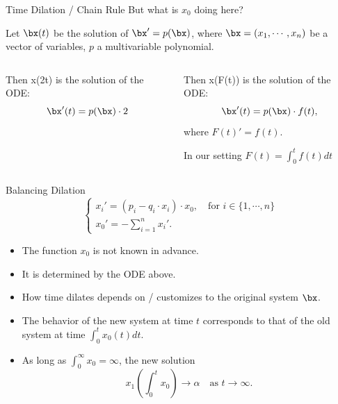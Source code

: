\documentclass[aspectratio=169]{beamer}
\begin{document}
\begin{frame}[Clean]{Time Dilation / Chain Rule}
But what is $x_0$ doing here?

Let $\bx(t)$ be the solution of $\bx' = p(\bx)$, where $\bx=(x_1, \cdots, x_n)$ be a vector of variables, $p$ a multivariable polynomial.
\begin{columns}
\begin{column}{0.5\textwidth}
   \begin{example}
 Then x(2t) is the solution of the ODE:
    \[
        \bx'(t) = p(\bx) \cdot 2
    \]
\end{example}
\end{column}
\begin{column}{0.5\textwidth}  %
\begin{example}
  Then x(F(t)) is the solution of the ODE:
  \[
        \bx'(t) = p(\bx) \cdot f(t),
  \]
  where $F(t)' = f(t)$.

  In our setting $F(t) =\int_{0}^{t} f(t) dt$
\end{example}
\end{column}
\end{columns}
\end{frame}

\begin{frame}[Clean]{Balancing Dilation}
\[
\begin{cases}
  x_i' = (p_i - q_i \cdot x_i)\cdot x_0,  \quad \text{for $i\in\{1, \cdots, n\}$}\\
  x_0' = -\sum_{i=1}^{n} x_i'.
\end{cases}
\]
\begin{itemize}
    \item The function $x_0$ is not known in advance.
    \item It is determined by the ODE above.
    \item How time dilates depends on / customizes to the original system $\bx$.
    \item The behavior of the new system at time $t$ corresponds to that of the old system at time $\int_0^{t}x_0(t)dt$.
    \item As long as $\int_0^{\infty}x_0 = \infty$, the new solution
    \[
        x_1(\int_0^{t}x_0) \to \alpha \quad\text{as $t\to\infty$.}
    \]
\end{itemize}
\end{frame}
\end{document}
